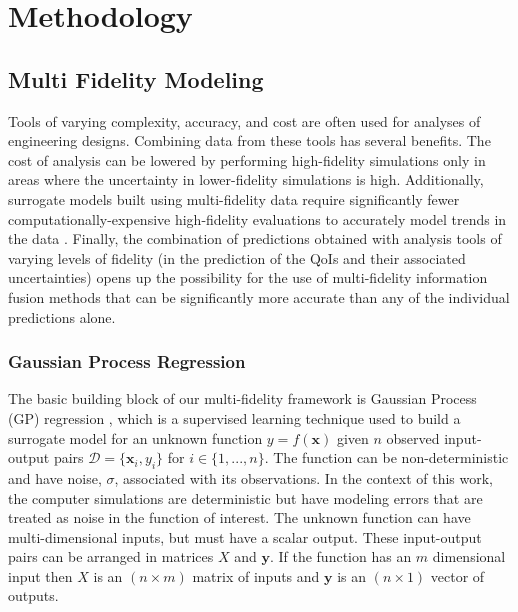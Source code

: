 \chapter{Methodology} \label{sec:methodology}

\section{Multi Fidelity Modeling} \label{sec:mf_modeling}

Tools of varying complexity, accuracy, and cost are often used for analyses of engineering designs. Combining data from these tools has several benefits. The cost of analysis can be lowered by performing high-fidelity simulations only in areas where the uncertainty in lower-fidelity simulations is high. Additionally, surrogate models built using multi-fidelity data require significantly fewer computationally-expensive high-fidelity evaluations to accurately model trends in the data \cite{robinson2008surrogate}. Finally, the combination of predictions obtained with analysis tools of varying levels of fidelity (in the prediction of the QoIs and their associated uncertainties) opens up the possibility for the use of multi-fidelity information fusion methods that can be significantly more accurate than any of the individual predictions alone.

\subsection{Gaussian Process Regression}\label{sec:GPR}
The basic building block of our multi-fidelity framework is Gaussian Process (GP) regression \cite{rasmussen_gaussian_2006}, which is a supervised learning technique used to build a surrogate model for an unknown function $y = f(\mathbf{x})$ given $n$ observed input-output pairs $\mathcal{D} = \{\mathbf{x}_i, y_i\}$ for $i \in\{1,...,n\}$. The function can be non-deterministic and have noise, $\sigma$, associated with its observations. In the context of this work, the computer simulations are deterministic but have modeling errors that are treated as noise in the function of interest. The unknown function can have multi-dimensional inputs, but must have a scalar output. These input-output pairs can be arranged in matrices $X$ and $\mathbf{y}$. If the function has an $m$ dimensional input then $X$ is an $\left (n \times m \right)$ matrix of inputs and $\mathbf{y}$ is an $\left (n \times 1 \right)$ vector of outputs.


